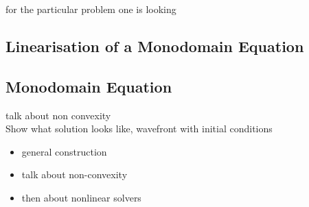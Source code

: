 \documentclass[../draft_1.tex]{subfiles}
\begin{document}
 for the particular problem one is looking 

\subsection{Linearisation of a Monodomain Equation}


\subsection{Monodomain Equation}



talk about non convexity \\
Show what solution looks like, wavefront with initial conditions \\


\begin{itemize}
	\item general construction
	\item talk about non-convexity 
	\item then about nonlinear solvers
	
\end{itemize}
\end{document}
